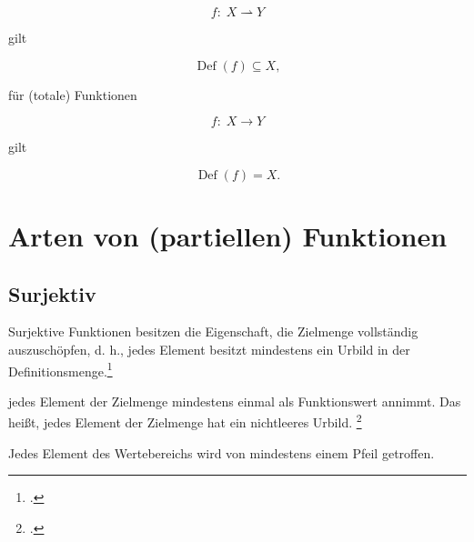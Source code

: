\documentclass{lehramt-informatik-haupt}
\begin{document}
\begin{displaymath}
f\colon \;X \rightharpoonup Y
\end{displaymath}

\noindent
gilt

\begin{displaymath}
\operatorname {Def} (f) \subseteq X ,
\end{displaymath}

\noindent
für (totale) Funktionen

\begin{displaymath}
f \colon \; X \to Y
\end{displaymath}

 gilt

\begin{displaymath}
\operatorname {Def} (f)=X .
\end{displaymath}



\section{Arten von (partiellen) Funktionen}

%

\subsection{Surjektiv}

Surjektive Funktionen besitzen die Eigenschaft, die Zielmenge
vollständig auszuschöpfen, d. h., jedes Element besitzt mindestens ein
Urbild in der Definitionsmenge.\footcite[Seite 51]{hoffmann}

jedes Element der Zielmenge mindestens einmal als Funktionswert annimmt.
Das heißt, jedes Element der Zielmenge hat ein nichtleeres Urbild.
\footcite{wiki:surjektiv}

Jedes Element des Wertebereichs wird von mindestens einem Pfeil getroffen.

\begin{center}
\end{center}
\end{document}
